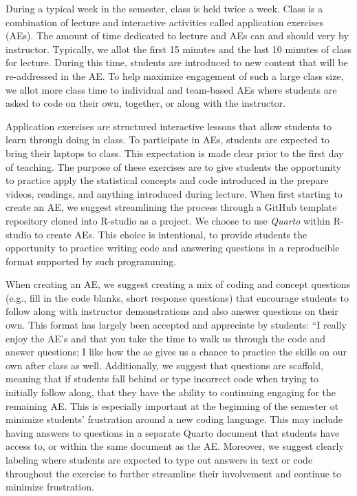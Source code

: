\documentclass[
  12pt]{article}
\begin{document}
During a typical week in the semester, class is held twice a week. Class
is a combination of lecture and interactive activities called
application exercises (AEs). The amount of time dedicated to lecture and
AEs can and should very by instructor. Typically, we allot the first 15
minutes and the last 10 minutes of class for lecture. During this time,
students are introduced to new content that will be re-addressed in the
AE. To help maximize engagement of such a large class size, we allot
more class time to individual and team-based AEs where students are
asked to code on their own, together, or along with the instructor.

Application exercises are structured interactive lessons that allow
students to learn through doing in class. To participate in AEs,
students are expected to bring their laptops to class. This expectation
is made clear prior to the first day of teaching. The purpose of these
exercises are to give students the opportunity to practice apply the
statistical concepts and code introduced in the prepare videos,
readings, and anything introduced during lecture. When first starting to
create an AE, we suggest streamlining the process through a GitHub
template repository cloned into R-studio as a project. We choose to use
\emph{Quarto} within R-studio to create AEs. This choice is intentional,
to provide students the opportunity to practice writing code and
answering questions in a reproducible format supported by such
programming.

When creating an AE, we suggest creating a mix of coding and concept
questions (e.g., fill in the code blanks, short response questions) that
encourage students to follow along with instructor demonstrations and
also answer questions on their own. This format has largely been
accepted and appreciate by students: ``I really enjoy the AE's and that
you take the time to walk us through the code and answer questions; I
like how the ae gives us a chance to practice the skills on our own
after class as well. Additionally, we suggest that questions are
scaffold, meaning that if students fall behind or type incorrect code
when trying to initially follow along, that they have the ability to
continuing engaging for the remaining AE. This is especially important
at the beginning of the semester ot minimize students' frustration
around a new coding language. This may include having answers to
questions in a separate Quarto document that students have access to, or
within the same document as the AE. Moreover, we suggest clearly
labeling where students are expected to type out answers in text or code
throughout the exercise to further streamline their involvement and
continue to minimize frustration.
\end{document}
